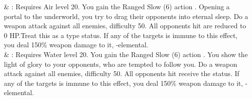 \begin{tabjob}
     & %
    : Requires Air level 20. You gain the Ranged Slow (6) action . Opening a portal to the underworld, you try to drag their opponents into eternal sleep. Do a weapon attack against all enemies, difficulty 50. All opponents hit are reduced to 0 HP.\@{}Treat this as a  type status. If any of the targets is immune to this effect, you deal 150\% weapon damage to it, -elemental. \\
     & %
    : Requires Water level 20. You gain the Ranged Slow (6) action . You show the light of glory to your opponents, who are tempted to follow you. Do a weapon attack against all enemies, difficulty 50. All opponents hit receive the  status. If any of the targets is immune to this effect, you deal 150\% weapon damage to it, -elemental. \\
\end{tabjob}
\begin{center}
\end{center}
